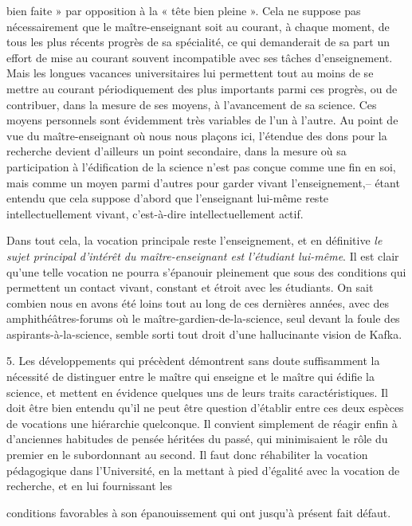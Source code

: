 \documentclass[11pt,a4paper]{article}
\begin{document}
bien faite » par opposition à la « tête bien pleine ». Cela ne suppose pas
nécessairement que le maître-enseignant soit au courant, à chaque moment,
de tous les plus récents progrès de sa spécialité, ce qui demanderait de sa
part un effort de mise au courant souvent incompatible avec ses tâches
d'enseignement. Mais les longues vacances universitaires lui permettent
tout au moins de se mettre au courant périodiquement des plus importants
parmi ces progrès, ou de contribuer, dans la mesure de ses moyens, à
l'avancement de sa science. Ces moyens personnels sont évidemment très
variables de l'un à l'autre. Au point de vue du maître-enseignant où nous
nous plaçons ici, l'étendue des dons pour la recherche devient d'ailleurs
un point secondaire, dans la mesure où sa participation à l'édification de
la science n'est pas conçue comme une fin en soi, mais comme un moyen parmi
d'autres pour garder vivant l'enseignement,-- étant entendu que cela suppose
d'abord que l'enseignant lui-même reste intellectuellement vivant,
c'est-à-dire intellectuellement actif.

Dans tout cela, la vocation principale reste l'enseignement, et
en définitive \emph{le sujet principal d'intérêt du maître-enseignant est l'étudiant
lui-même}. Il est clair qu'une telle vocation ne pourra s'épanouir pleinement
que sous des conditions qui permettent un contact vivant, constant et étroit
avec les étudiants. On sait combien nous en avons été loins tout au long de
ces dernières années, avec des amphithéâtres-forums où le
maître-gardien-de-la-science, seul devant la foule des aspirants-à-la-science, semble sorti
tout droit d'une hallucinante vision de Kafka.

5. Les développements qui précèdent démontrent sans doute suffisamment la
nécessité de distinguer entre le maître qui enseigne et le maître qui édifie
la science, et mettent en évidence quelques uns de leurs traits
caractéristiques. Il doit être bien entendu qu'il ne peut être question d'établir entre
ces deux espèces de vocations une hiérarchie quelconque. Il convient
simplement de réagir enfin à d'anciennes habitudes de pensée héritées du passé,
qui minimisaient le rôle du premier en le subordonnant au second. Il faut
donc réhabiliter la vocation pédagogique dans l'Université, en la mettant
à pied d'égalité avec la vocation de recherche, et en lui fournissant les

conditions favorables à son épanouissement qui ont jusqu'à présent fait
défaut.
\end{document}
